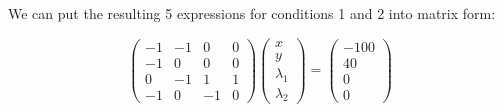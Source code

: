 We can put the resulting 5 expressions for conditions 1 and 2 into matrix form:

\[
  \begin{pmatrix} -1 & -1 & 0&0\\ -1&0&0&0\\ 0&-1&1&1\\ -1&0&-1&0 \end{pmatrix}
  \begin{pmatrix} x\\y\\\lambda_1\\\lambda_2\end{pmatrix}=
  \begin{pmatrix} -100\\ 40\\0\\0 \end{pmatrix}
\]

